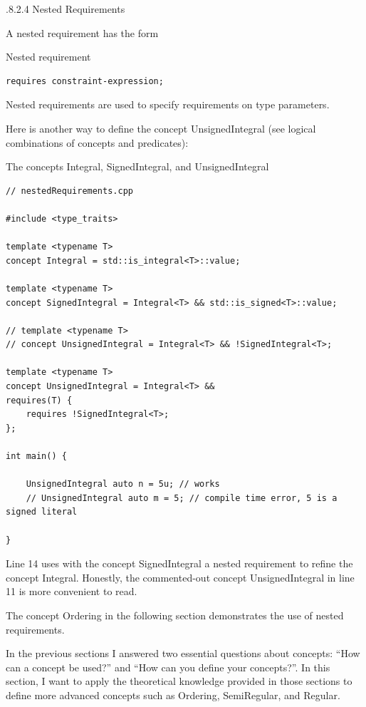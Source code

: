 .8.2.4\hspace{0.2cm} Nested Requirements

A nested requirement has the form

\noindent
Nested requirement
\begin{lstlisting}[style=styleCXX]
requires constraint-expression;
\end{lstlisting}

Nested requirements are used to specify requirements on type parameters.

Here is another way to define the concept UnsignedIntegral (see logical combinations of concepts and predicates):

\noindent
The concepts Integral, SignedIntegral, and UnsignedIntegral
\begin{lstlisting}[style=styleCXX]
// nestedRequirements.cpp

#include <type_traits>

template <typename T>
concept Integral = std::is_integral<T>::value;

template <typename T>
concept SignedIntegral = Integral<T> && std::is_signed<T>::value;

// template <typename T>
// concept UnsignedIntegral = Integral<T> && !SignedIntegral<T>;

template <typename T>
concept UnsignedIntegral = Integral<T> &&
requires(T) {
	requires !SignedIntegral<T>;
};

int main() {

	UnsignedIntegral auto n = 5u; // works
	// UnsignedIntegral auto m = 5; // compile time error, 5 is a signed literal

}
\end{lstlisting}

Line 14 uses with the concept SignedIntegral a nested requirement to refine the concept Integral. Honestly, the commented-out concept UnsignedIntegral in line 11 is more convenient to read.

The concept Ordering in the following section demonstrates the use of nested requirements.


In the previous sections I answered two essential questions about concepts: “How can a concept be used?” and “How can you define your concepts?”. In this section, I want to apply the theoretical knowledge provided in those sections to define more advanced concepts such as Ordering, SemiRegular, and Regular.

